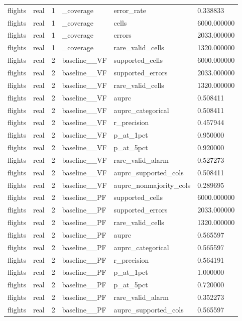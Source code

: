 \begin{tabular}{llllll}
flights & real & 1 & \_coverage & error\_rate & 0.338833 \\
flights & real & 1 & \_coverage & cells & 6000.000000 \\
flights & real & 1 & \_coverage & errors & 2033.000000 \\
flights & real & 1 & \_coverage & rare\_valid\_cells & 1320.000000 \\
flights & real & 2 & baseline\_\_VF & supported\_cells & 6000.000000 \\
flights & real & 2 & baseline\_\_VF & supported\_errors & 2033.000000 \\
flights & real & 2 & baseline\_\_VF & rare\_valid\_cells & 1320.000000 \\
flights & real & 2 & baseline\_\_VF & auprc & 0.508411 \\
flights & real & 2 & baseline\_\_VF & auprc\_categorical & 0.508411 \\
flights & real & 2 & baseline\_\_VF & r\_precision & 0.457944 \\
flights & real & 2 & baseline\_\_VF & p\_at\_1pct & 0.950000 \\
flights & real & 2 & baseline\_\_VF & p\_at\_5pct & 0.920000 \\
flights & real & 2 & baseline\_\_VF & rare\_valid\_alarm & 0.527273 \\
flights & real & 2 & baseline\_\_VF & auprc\_supported\_cols & 0.508411 \\
flights & real & 2 & baseline\_\_VF & auprc\_nonmajority\_cols & 0.289695 \\
flights & real & 2 & baseline\_\_PF & supported\_cells & 6000.000000 \\
flights & real & 2 & baseline\_\_PF & supported\_errors & 2033.000000 \\
flights & real & 2 & baseline\_\_PF & rare\_valid\_cells & 1320.000000 \\
flights & real & 2 & baseline\_\_PF & auprc & 0.565597 \\
flights & real & 2 & baseline\_\_PF & auprc\_categorical & 0.565597 \\
flights & real & 2 & baseline\_\_PF & r\_precision & 0.564191 \\
flights & real & 2 & baseline\_\_PF & p\_at\_1pct & 1.000000 \\
flights & real & 2 & baseline\_\_PF & p\_at\_5pct & 0.720000 \\
flights & real & 2 & baseline\_\_PF & rare\_valid\_alarm & 0.352273 \\
flights & real & 2 & baseline\_\_PF & auprc\_supported\_cols & 0.565597 \\

\end{tabular}
